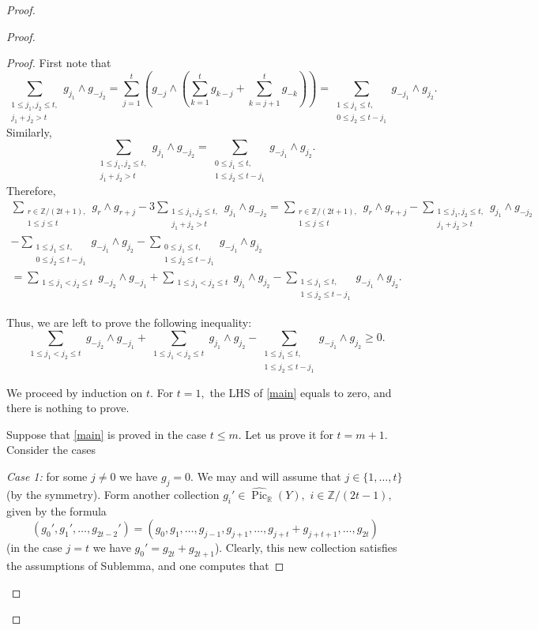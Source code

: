 \documentclass[11pt,leqno]{amsart}
\numberwithin{equation}{section}
\def\R{\mathbb{R}}
\def\Z{\mathbb{Z}}
\newcommand{\Pic}{\operatorname{Pic}}
\begin{document}
\begin{proof}
\begin{proof}
\begin{proof}First note that
$$\sum_{\substack{1\leq j_1,j_2\leq t,\\
j_1+j_2>t}}g_{j_1}\wedge g_{-j_2}=\sum\limits_{j=1}^t(g_{-j}\wedge (\sum\limits_{k=1}^tg_{k-j}+\sum\limits_{k=j+1}^tg_{-k}))=\sum_{\substack{1\leq j_1\leq t,\\
0\leq j_2\leq t-j_1}}g_{-j_1}\wedge g_{j_2}.$$
Similarly,
$$\sum_{\substack{1\leq j_1,j_2\leq t,\\
j_1+j_2>t}}g_{j_1}\wedge g_{-j_2}=\sum_{\substack{0\leq j_1\leq t,\\
1\leq j_2\leq t-j_1}}g_{-j_1}\wedge g_{j_2}.$$
Therefore,
\begin{multline*}\sum_{\substack{r\in\Z/(2t+1),\\
1\leq j\leq t}}g_r\wedge g_{r+j}-3\sum_{\substack{1\leq j_1,j_2\leq t,\\
j_1+j_2>t}}g_{j_1}\wedge g_{-j_2}=\sum_{\substack{r\in\Z/(2t+1),\\
1\leq j\leq t}}g_r\wedge g_{r+j}-\sum_{\substack{1\leq j_1,j_2\leq t,\\
j_1+j_2>t}}g_{j_1}\wedge g_{-j_2}\\-\sum_{\substack{1\leq j_1\leq t,\\
0\leq j_2\leq t-j_1}}g_{-j_1}\wedge g_{j_2}-\sum_{\substack{0\leq j_1\leq t,\\
1\leq j_2\leq t-j_1}}g_{-j_1}\wedge g_{j_2}\\=\sum_{\substack{1\leq j_1<j_2\leq t}}g_{-j_2}\wedge g_{-j_1}
+\sum_{\substack{1\leq j_1<j_2\leq t}}g_{j_1}\wedge g_{j_2}-\sum_{\substack{1\leq j_1\leq t,\\
1\leq j_2\leq t-j_1}}g_{-j_1}\wedge g_{j_2}.\end{multline*}

Thus, we are left to prove the following inequality:
\begin{equation}\label{main}\sum_{\substack{1\leq j_1<j_2\leq t}}g_{-j_2}\wedge g_{-j_1}
+\sum_{\substack{1\leq j_1<j_2\leq t}}g_{j_1}\wedge g_{j_2}-\sum_{\substack{1\leq j_1\leq t,\\
1\leq j_2\leq t-j_1}}g_{-j_1}\wedge g_{j_2}\geq 0.\end{equation}

We proceed by induction on $t.$ For $t=1,$ the LHS of \eqref{main} equals to zero, and there is nothing to prove.

Suppose that \eqref{main} is proved in the case $t\leq m.$ Let us prove it for $t=m+1.$
Consider the cases

{\it Case 1:} for some $j\ne 0$ we have $g_j=0.$ We may and will assume that $j\in \{1,\dots,t\}$ (by the symmetry).
Form another collection $g_i'\in\widehat{\Pic}_{\R}(Y),$
$i\in\Z/(2t-1),$ given by the formula
$$(g_0',g_1',\dots,g_{2t-2}')=(g_0,g_1,\dots,g_{j-1},g_{j+1},\dots,g_{j+t}+g_{j+t+1},\dots,g_{2t})$$
(in the case $j=t$ we have $g_0'=g_{2t}+g_{2t+1}$). Clearly, this new collection satisfies the assumptions of Sublemma, and one computes that


\end{proof}
\end{proof}
\end{proof}
\end{document}
